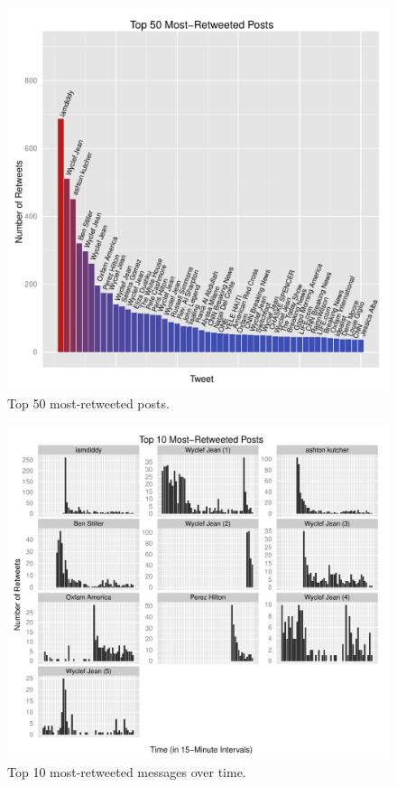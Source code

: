 \documentclass[a4paper, 11pt, titlepage]{article}
\begin{document}
\begin{figure}[h]
\centering
\label{fig:rt_top_50}
\includegraphics[width=120mm]{../figures/rt_top_50}
\caption{Top 50 most-retweeted posts.}
\end{figure}

\begin{figure}[h]
  \centering
\label{fig:rt_top_10}
\includegraphics[width=120mm]{../figures/rt_top_10_over_time_free_scale}
\caption{Top 10 most-retweeted messages over time.}
\end{figure}
\end{document}
